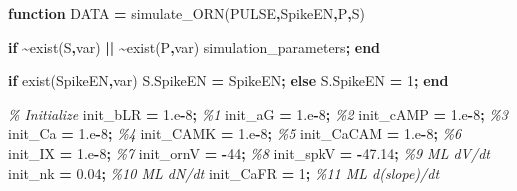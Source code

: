 \documentclass[
]{article}
\newenvironment{Shaded}{\begin{snugshade}}{\end{snugshade}}
\newcommand{\CommentTok}[1]{\textcolor[rgb]{0.56,0.35,0.01}{\textit{#1}}}
\newcommand{\ControlFlowTok}[1]{\textcolor[rgb]{0.13,0.29,0.53}{\textbf{#1}}}
\newcommand{\FloatTok}[1]{\textcolor[rgb]{0.00,0.00,0.81}{#1}}
\newcommand{\FunctionTok}[1]{\textcolor[rgb]{0.00,0.00,0.00}{#1}}
\newcommand{\NormalTok}[1]{#1}
\newcommand{\OperatorTok}[1]{\textcolor[rgb]{0.81,0.36,0.00}{\textbf{#1}}}
\newcommand{\StringTok}[1]{\textcolor[rgb]{0.31,0.60,0.02}{#1}}
\begin{document}
\begin{Shaded}
\begin{Highlighting}[]
\ControlFlowTok{function}\NormalTok{ DATA }\OperatorTok{=}\NormalTok{ simulate\_ORN(PULSE}\OperatorTok{,}\NormalTok{SpikeEN}\OperatorTok{,}\NormalTok{P}\OperatorTok{,}\NormalTok{S) }

\ControlFlowTok{if} \OperatorTok{\textasciitilde{}}\FunctionTok{exist}\NormalTok{(}\StringTok{\textquotesingle{}S\textquotesingle{}}\OperatorTok{,}\StringTok{\textquotesingle{}var\textquotesingle{}}\NormalTok{) }\OperatorTok{||} \OperatorTok{\textasciitilde{}}\FunctionTok{exist}\NormalTok{(}\StringTok{\textquotesingle{}P\textquotesingle{}}\OperatorTok{,}\StringTok{\textquotesingle{}var\textquotesingle{}}\NormalTok{)}
\NormalTok{    simulation\_parameters}\OperatorTok{;}
\ControlFlowTok{end}

\ControlFlowTok{if} \FunctionTok{exist}\NormalTok{(}\StringTok{\textquotesingle{}SpikeEN\textquotesingle{}}\OperatorTok{,}\StringTok{\textquotesingle{}var\textquotesingle{}}\NormalTok{)}
\NormalTok{    S.SpikeEN }\OperatorTok{=}\NormalTok{ SpikeEN}\OperatorTok{;}
\ControlFlowTok{else}
\NormalTok{    S.SpikeEN }\OperatorTok{=} \FloatTok{1}\OperatorTok{;}
\ControlFlowTok{end}

\CommentTok{\% Initialize}
\NormalTok{init\_bLR    }\OperatorTok{=} \FloatTok{1}\NormalTok{.e}\OperatorTok{{-}}\FloatTok{8}\OperatorTok{;} \CommentTok{\%1}
\NormalTok{init\_aG     }\OperatorTok{=} \FloatTok{1}\NormalTok{.e}\OperatorTok{{-}}\FloatTok{8}\OperatorTok{;} \CommentTok{\%2}
\NormalTok{init\_cAMP   }\OperatorTok{=} \FloatTok{1}\NormalTok{.e}\OperatorTok{{-}}\FloatTok{8}\OperatorTok{;} \CommentTok{\%3}
\NormalTok{init\_Ca     }\OperatorTok{=} \FloatTok{1}\NormalTok{.e}\OperatorTok{{-}}\FloatTok{8}\OperatorTok{;} \CommentTok{\%4}
\NormalTok{init\_CAMK   }\OperatorTok{=} \FloatTok{1}\NormalTok{.e}\OperatorTok{{-}}\FloatTok{8}\OperatorTok{;} \CommentTok{\%5}
\NormalTok{init\_CaCAM  }\OperatorTok{=} \FloatTok{1}\NormalTok{.e}\OperatorTok{{-}}\FloatTok{8}\OperatorTok{;} \CommentTok{\%6}
\NormalTok{init\_IX     }\OperatorTok{=} \FloatTok{1}\NormalTok{.e}\OperatorTok{{-}}\FloatTok{8}\OperatorTok{;} \CommentTok{\%7}
\NormalTok{init\_ornV   }\OperatorTok{=} \OperatorTok{{-}}\FloatTok{44}\OperatorTok{;}   \CommentTok{\%8}
\NormalTok{init\_spkV   }\OperatorTok{=} \OperatorTok{{-}}\FloatTok{47.14}\OperatorTok{;} \CommentTok{\%9 ML dV/dt}
\NormalTok{init\_nk     }\OperatorTok{=} \FloatTok{0.04}\OperatorTok{;}  \CommentTok{\%10 ML dN/dt }
\NormalTok{init\_CaFR   }\OperatorTok{=} \FloatTok{1}\OperatorTok{;}     \CommentTok{\%11 ML d(slope)/dt}


\end{Highlighting}
\end{Shaded}
\end{document}
